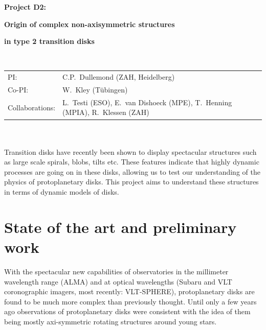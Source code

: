 \documentclass[10pt,fleqn,twoside]{article}
\begin{document}
\newpage


\setcounter{page}{1}

\centerline{\huge\bf\Tcol
%
%
%
%
%
 Project D2:}
\vspace{1em}

\centerline{\LARGE\bf\Tcol Origin of complex non-axisymmetric structures}\vspace{0.3em}
\centerline{\LARGE\bf\Tcol in type 2 transition disks}

%
%
%
%
%
\vskip1.0cm


\\
\begin{tabular}{ll}
{\textsf{PI:}}                 & C.P.~Dullemond (ZAH, Heidelberg)\\
{\textsf{Co-PI:}}              & W.~Kley (T\"ubingen)\\
{\textsf{Collaborations:}}     & L.~Testi (ESO), E.~van Dishoeck (MPE), T.~Henning (MPIA), R.~Klessen (ZAH)\\
\end{tabular}


\vspace{1em}
 \\

\vspace{1em}
\\
Transition disks have recently been shown to display spectacular structures
such as large scale spirals, blobs, tilts etc. These features indicate that
highly dynamic processes are going on in these disks, allowing us to test
our understanding of the physics of protoplanetary disks. This project aims
to understand these structures in terms of dynamic models of disks.


\section{State of the art and preliminary work}
\renewcommand{\leftmark}{\sc State of the Art and preliminary work}
With the spectacular new capabilities of observatories in the millimeter
wavelength range (ALMA) and at optical wavelengths (Subaru and VLT
coronographic imagers, most recently: VLT-SPHERE), protoplanetary disks are
found to be much more complex than previously thought. Until only a few
years ago observations of protoplanetary disks were consistent with the idea
of them being mostly axi-symmetric rotating structures around young stars.  
\end{document}
